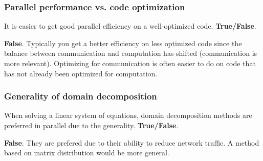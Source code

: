 \subsubsection{Parallel performance vs. code optimization} %
\label{ssub:parallel_performance_vs_code_optimization}

\begin{question}
  It is easier to get good parallel efficiency on a well-optimized code. \textbf{True/False}.
\end{question}

\textbf{False}. Typically you get a better efficiency on less optimized code since the balance between communication and computation has shifted (communication is more relevant). Optimizing for communication is often easier to do on code that has not already been optimized for computation.

\subsubsection{Generality of domain decomposition} %
\label{ssub:generality_of_domain_decomposition}

\begin{question}
  When solving a linear system of equations, domain decomposition methods are preferred in parallel due to the generality. \textbf{True/False}.
\end{question}

\textbf{False}. They are prefered due to their ability to reduce network traffic. A method based on matrix distribution would be more general.




